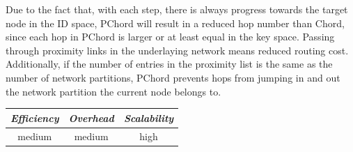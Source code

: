 Due to the fact that, with each step, there is always progress towards the
target node in the ID space, PChord will result in a reduced hop number than
Chord, since each hop in PChord is larger or at least equal in the key space.
Passing through proximity links in the underlaying network means reduced routing
cost. Additionally, if the number of entries in the proximity list is the same
as the number of network partitions, PChord prevents hops from jumping in and
out the network partition the current node belongs to.



\begin{center}
\begin{tabular}{ccc}
\emph{Efficiency} & \emph{Overhead} & \emph{Scalability} \\
\hline
medium &
medium &
high
\end{tabular}
\end{center}


